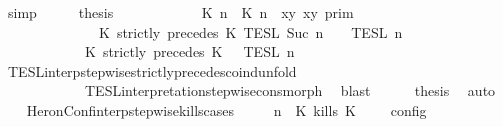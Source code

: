 \begin{isabellebody}
\ simp\isanewline
\ \ \isamarkupfalse%
\ \isamarkupfalse%
\ {\isacharquery}thesis\isanewline
\ \ \isamarkupfalse%
\ {\isacharminus}\isanewline
\ \ \ \ \isamarkupfalse%
\ {\isacartoucheopen}{\isasymlbrakk}\ {\isasymlceil}{\isacharhash}\isactrlsup {\isasymle}\ K\ n{\isacharcomma}\ {\isacharhash}\isactrlsup {\isacharless}\ K\ n{\isasymrceil}\ {\isasymin}\ {\isacharparenleft}{\isasymlambda}{\isacharparenleft}x{\isacharcomma}y{\isacharparenright}{\isachardot}\ x{\isasymle}y{\isacharparenright}\ {\isasymrbrakk}\isactrlsub p\isactrlsub r\isactrlsub i\isactrlsub m\isanewline
\ \ \ \ \ \ \ \ \ \ \ \ {\isasyminter}\ {\isasymlbrakk}\ K\ strictly\ precedes\ K\ {\isasymrbrakk}\isactrlsub T\isactrlsub E\isactrlsub S\isactrlsub L\isactrlbsup {\isasymge}\ Suc\ n\isactrlesup \ {\isasyminter}\ {\isasymlbrakk}{\isasymlbrakk}\ {\isasymPsi}\ {\isasymrbrakk}{\isasymrbrakk}\isactrlsub T\isactrlsub E\isactrlsub S\isactrlsub L\isactrlbsup {\isasymge}\ n\isactrlesup \isanewline
\ \ \ \ \ \ \ \ \ \ {\isacharequal}\ {\isasymlbrakk}{\isasymlbrakk}\ {\isacharparenleft}K\ strictly\ precedes\ K\ {\isacharhash}\ {\isasymPsi}\ {\isasymrbrakk}{\isasymrbrakk}\isactrlsub T\isactrlsub E\isactrlsub S\isactrlsub L\isactrlbsup {\isasymge}\ n\isactrlesup {\isacartoucheclose}\isanewline
\ \ \ \ \ \ \isamarkupfalse%
\ TESL{\isacharunderscore}interp{\isacharunderscore}stepwise{\isacharunderscore}strictly{\isacharunderscore}precedes{\isacharunderscore}coind{\isacharunderscore}unfold\isanewline
\ \ \ \ \ \ \ \ \ \ \ \ TESL{\isacharunderscore}interpretation{\isacharunderscore}stepwise{\isacharunderscore}cons{\isacharunderscore}morph\ \isamarkupfalse%
\ blast\isanewline
\ \ \ \ \isamarkupfalse%
\ {\isacharquery}thesis\ \isamarkupfalse%
\ auto\isanewline
\ \ \isamarkupfalse%
\isanewline
{}\isamarkupfalse%
%
\endisatagproof
{\isafoldproof}%
%
\isadelimproof
\isanewline
%
\endisadelimproof
\isanewline
{}\isamarkupfalse%
\ HeronConf{\isacharunderscore}interp{\isacharunderscore}stepwise{\isacharunderscore}kills{\isacharunderscore}cases{\isacharcolon}\isanewline
\ \ \ {\isacartoucheopen}{\isasymlbrakk}\ {\isasymGamma}{\isacharcomma}\ n\ {\isasymturnstile}\ {\isacharparenleft}{\isacharparenleft}K\ kills\ K\ {\isacharhash}\ {\isasymPsi}{\isacharparenright}\ {\isasymtriangleright}\ {\isasymPhi}\ {\isasymrbrakk}\isactrlsub c\isactrlsub o\isactrlsub n\isactrlsub f\isactrlsub i\isactrlsub g\isanewline

\end{isabellebody}

